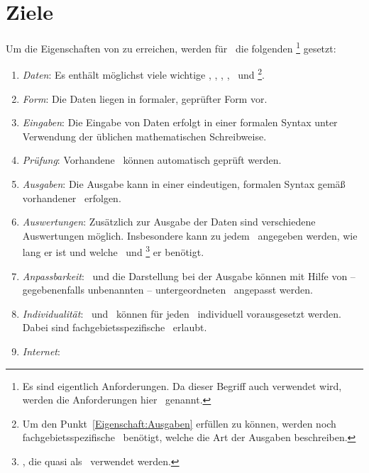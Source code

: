 \section{Ziele}%
\label{sec:Ziele}

Um die Eigenschaften von  zu erreichen, werden für \ASBA\ die folgenden \Ziele%
\footnote{%
	Es sind eigentlich Anforderungen.
	Da dieser Begriff auch  verwendet wird, werden die Anforderungen hier \Ziele\ genannt.
}
gesetzt:
\begin{enumerate}
	\item \label{Ziel:Daten} \emph{Daten}:
	Es enthält möglichst viele wichtige \Axiome, \Saetze, \Beweise, \Fachbegriffe, \Fachgebiete\ und \Ausgabeschemata%
	\footnote{%
		Um den Punkt~\ref{Eigenschaft:Ausgaben}  erfüllen zu können, werden noch fachgebietsspezifische \Ausgabeschemata\ benötigt, welche die Art der Ausgaben beschreiben.
	}.
	\item \label{Ziel:Form} \emph{Form}:
	Die Daten liegen in formaler, geprüfter Form vor.
	\item \label{Ziel:Eingaben} \emph{Eingaben}:
	Die Eingabe von Daten erfolgt in einer formalen Syntax unter Verwendung der üblichen mathematischen Schreibweise.
	\item \label{Ziel:Prüfung} \emph{Prüfung}:
	Vorhandene \Beweise\ können automatisch geprüft werden.
	\item \label{Ziel:Ausgaben} \emph{Ausgaben}:
	Die Ausgabe kann in einer eindeutigen, formalen Syntax gemäß vorhandener \Ausgabeschemata\ erfolgen.
	\item \label{Ziel:Auswertungen} \emph{Auswertungen}:
	Zusätzlich zur Ausgabe der Daten sind verschiedene Auswertungen möglich.
	Insbesondere kann zu jedem \Beweis\ angegeben werden, wie lang er ist und welche \Axiome\ und \Saetze%
	\footnote{
		\Saetze, die quasi als \Axiome\ verwendet werden.
	}
	er benötigt.
	\item \label{Ziel:Anpassbarkeit} \emph{Anpassbarkeit}:
	\Fachbegriffe\ und die Darstellung bei der Ausgabe können mit Hilfe von -- gegebenenfalls unbenannten -- untergeordneten \Fachgebieten\ angepasst werden.
	\item \label{Ziel:Individualität} \emph{Individualität}:
	\Axiome\ und \Saetze\ können für jeden \Beweis\ individuell vorausgesetzt werden.
	Dabei sind fachgebietsspezifische \Fachbegriffe\ erlaubt.
	\item \label{Ziel:Internet} \emph{Internet}:

\end{enumerate}
